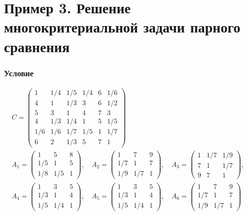 \documentclass[specialist,
  substylefile = spbu.rtx,
  href,
  colorlinks=true,
  12pt]{disser}
\begin{document}
\section{Пример 3. Решение многокритериальной задачи парного сравнения}

\subsubsection{Условие}
$$
\begin{array}{l}
	C=\left(\begin{array}{cccccc}
		1 & 1 / 4 & 1 / 5 & 1 / 4 & 6 & 1 / 6 \\
		4 & 1 & 1 / 3 & 3 & 6 & 1 / 2 \\
		5 & 3 & 1 & 4 & 7 & 3 \\
		4 & 1 / 3 & 1 / 4 & 1 & 5 & 1 / 5 \\
		1 / 6 & 1 / 6 & 1 / 7 & 1 / 5 & 1 & 1 / 7 \\
		6 & 2 & 1 / 3 & 5 & 7 & 1
	\end{array}\right) \\
	A_{1}=\left(\begin{array}{ccc}
		1 & 5 & 8 \\
		1 / 5 & 1 & 5 \\
		1 / 8 & 1 / 5 & 1
	\end{array}\right), \quad A_{2}=\left(\begin{array}{ccc}
		1 & 7 & 9 \\
		1 / 7 & 1 & 7 \\
		1 / 9 & 1 / 7 & 1
	\end{array}\right), \quad A_{3}=\left(\begin{array}{ccc}
		1 & 1 / 7 & 1 / 9 \\
		7 & 1 & 1 / 7 \\
		9 & 7 & 1
	\end{array}\right), \\
	A_{4}=\left(\begin{array}{ccc}
		1 & 3 & 5 \\
		1 / 3 & 1 & 4 \\
		1 / 5 & 1 / 4 & 1
	\end{array}\right), \quad A_{5}=\left(\begin{array}{ccc}
		1 & 3 & 5 \\
		1 / 3 & 1 & 4 \\
		1 / 5 & 1 / 4 & 1
	\end{array}\right), \quad A_{6}=\left(\begin{array}{ccc}
		1 & 7 & 9 \\
		1 / 7 & 1 & 7 \\
		1 / 9 & 1 / 7 & 1
	\end{array}\right)
\end{array}
$$
\end{document}
